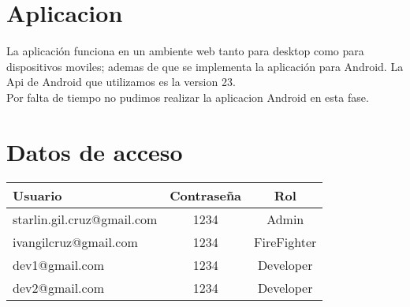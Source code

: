 \documentclass[12pt]{article}
\begin{document}
\section{Aplicacion}
La aplicación funciona en un ambiente web tanto para desktop como para dispositivos moviles; ademas de que se implementa la aplicación para Android. La Api de Android que utilizamos es la version 23.\\ 

Por falta de tiempo no pudimos realizar la aplicacion Android en esta fase.

\section{Datos de acceso}

\begin{tabular}{l c c}
Usuario & Contraseña & Rol\\ \hline
starlin.gil.cruz@gmail.com & 1234 & Admin\\
ivangilcruz@gmail.com & 1234 & FireFighter\\
dev1@gmail.com & 1234 & Developer\\
dev2@gmail.com & 1234 & Developer
\end{tabular}
\end{document}
